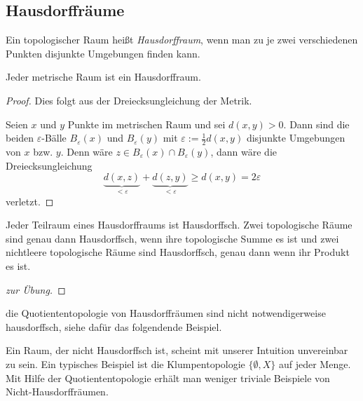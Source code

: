 \documentclass[a4paper,10pt]{scrartcl}
\newcommand{\eps}{\varepsilon}
\begin{document}
\subsection{Hausdorffräume}
\begin{df}
 Ein topologischer Raum heißt \emph{Hausdorffraum}, wenn man zu je zwei verschiedenen Punkten disjunkte Umgebungen finden kann.
\begin{figure}[H]
\centering
 \fixme[fig13]
\caption{}
\end{figure}
\end{df}
\begin{st}
Jeder metrische Raum ist ein Hausdorffraum. 
\end{st}
\begin{proof}
Dies folgt aus der Dreiecksungleichung der Metrik. 
\begin{figure}[H]
\centering
 \fixme[fig14]
\caption{}
\end{figure}
Seien $x$ und $y$ Punkte im metrischen Raum und sei $d(x,y)>0$.
Dann sind die beiden $\eps$-Bälle $B_\eps(x)$ und $B_\eps(y)$ mit $\eps:=\frac{1}{2}d(x,y)$ disjunkte Umgebungen von $x$ bzw. $y$. Denn 
wäre $z\in B_\eps(x) \cap B_\eps(y)$, dann wäre die Dreiecksungleichung
\[
\underbrace{d(x,z)}_{<\eps}+\underbrace{d(z,y)}_{<\eps}\ge d(x,y)=2\eps
\]        
verletzt.
\end{proof}
\begin{st}
Jeder Teilraum eines Hausdorffraums ist Hausdorffsch. Zwei topologische Räume sind genau dann Hausdorffsch, wenn ihre topologische Summe es ist und zwei nichtleere topologische Räume sind Hausdorffsch, genau dann wenn ihr Produkt es ist. 
\end{st}
\begin{proof}[zur Übung]\end{proof}
\begin{note*}
die Quotiententopologie von Hausdorffräumen sind nicht notwendigerweise hausdorffsch, siehe dafür das folgendende Beispiel.
\begin{figure}[H]
\centering
 \fixme[fig15]
\caption{}
\end{figure}
\end{note*}
Ein Raum, der nicht Hausdorffsch ist, scheint mit unserer Intuition unvereinbar zu sein.  Ein typisches Beispiel ist die Klumpentopologie $\{\emptyset, X\}$ auf jeder Menge. Mit Hilfe der Quotiententopologie erhält man weniger triviale Beispiele von Nicht-Hausdorffräumen.
\end{document}
